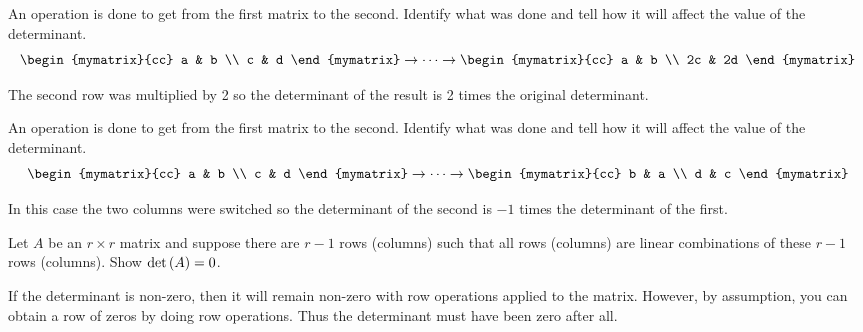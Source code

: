 \begin{enumialphparenastyle}
\begin{ex} An operation is done to get from the first matrix to the second.
Identify what was done and tell how it will affect the value of the
determinant. 
\begin{equation*}
\begin{mymatrix}{cc}
a & b \\
c & d
\end{mymatrix} \rightarrow \cdots \rightarrow \begin{mymatrix}{cc}
a & b \\
2c & 2d
\end{mymatrix}
\end{equation*}
\begin{sol}
The second row was multiplied by 2 so the determinant of the result is 2
times the original determinant.
\end{sol}
\end{ex}

\begin{ex} An operation is done to get from the first matrix to the second.
Identify what was done and tell how it will affect the value of the
determinant. 
\begin{equation*}
\begin{mymatrix}{cc}
a & b \\
c & d
\end{mymatrix} \rightarrow \cdots \rightarrow \begin{mymatrix}{cc}
b & a \\
d & c
\end{mymatrix}
\end{equation*}
\begin{sol}
In this case the two columns were switched so the determinant of the second
is $-1$ times the determinant of the first.
\end{sol}
\end{ex}


\begin{ex} Let $A$ be an $r\times r$ matrix and suppose there are $r-1$ rows
(columns) such that all rows (columns) are linear combinations of these $r-1$
rows (columns). Show $\det \left(A\right) =0$. 
\begin{sol}
If the determinant is non-zero, then it will remain non-zero with row operations applied to the matrix.
However, by assumption, you can obtain a row of zeros by doing row
operations. Thus the determinant must have been zero after all.
\end{sol}
\end{ex}


\end{enumialphparenastyle}
